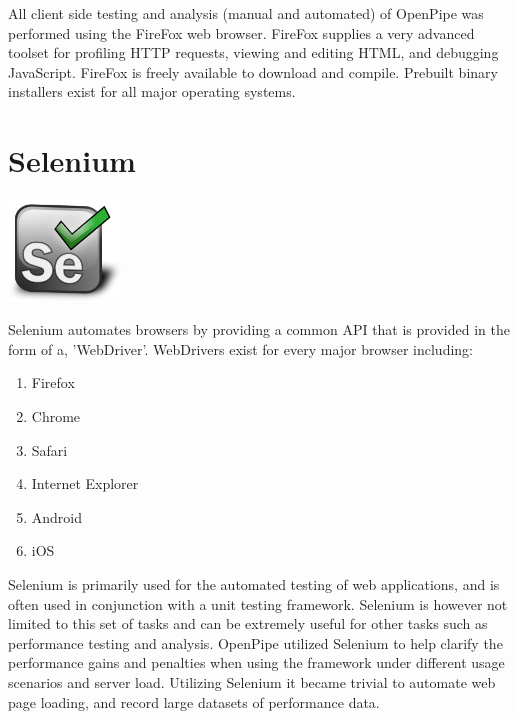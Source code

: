 \documentclass[12pt]{report}
\begin{document}
All client side testing and analysis (manual and automated) of OpenPipe was performed using the FireFox web browser. FireFox supplies a very advanced toolset for profiling HTTP requests, viewing and editing HTML, and debugging JavaScript. FireFox is freely available to download and compile. Prebuilt binary installers exist for all major operating systems. 
 

\section{Selenium}
\begin{center}
\includegraphics[width=30mm]{figures/images/selenium_logo.png}
\end{center}

Selenium automates browsers by providing a common API that is provided in the form of a, 'WebDriver'. WebDrivers exist for every major browser including:

\begin{enumerate}
\item Firefox
\item Chrome
\item Safari
\item Internet Explorer
\item Android
\item iOS
\end{enumerate}

Selenium is primarily used for the automated testing of web applications, and is often used in conjunction with a unit testing framework.  Selenium is however not limited to this set of tasks and can be extremely useful for other tasks such as performance testing and analysis. OpenPipe utilized Selenium to help clarify the performance gains and penalties when using the framework under different usage scenarios and server load. Utilizing Selenium it became trivial to automate web page loading, and record large datasets of performance data.




\end{document}

